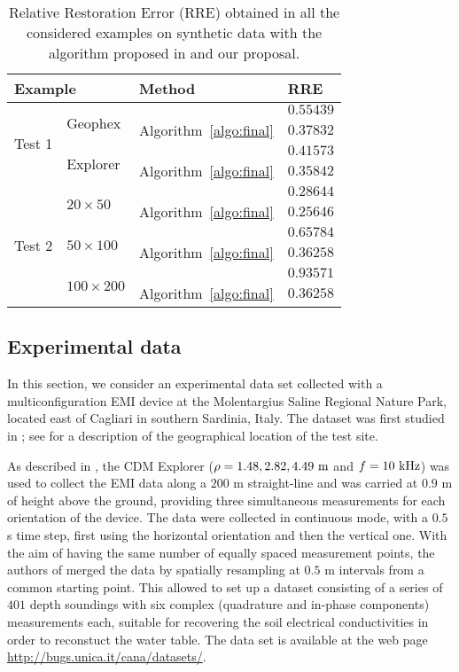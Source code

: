 \documentclass[final,leqno]{siamltex}
\begin{document}
\begin{table}
	\caption{Relative Restoration Error (RRE) obtained in all the considered examples on synthetic data with the algorithm proposed in \cite{ddrv19} and our proposal.}
	\label{tbl:rre}
	\begin{center}
		\begin{tabular}{l|l|l|l}
			\multicolumn{2}{l}{Example}&Method&RRE\\\hline
			\multirow{4}{*}{Test 1}&\multirow{2}{*}{Geophex}&\cite{ddrv19}&$0.55439$\\
			&&Algorithm~\ref{algo:final}&$0.37832$\\\cline{2-4}
			&\multirow{2}{*}{Explorer}&\cite{ddrv19}&$0.41573$\\
			&&Algorithm~\ref{algo:final}&$0.35842$\\\hline
			\multirow{6}{*}{Test 2}&\multirow{2}{*}{$20\times50$}&\cite{ddrv19}&$0.28644$\\
			&&Algorithm~\ref{algo:final}&$0.25646$\\\cline{2-4}
			&\multirow{2}{*}{$50\times100$}&\cite{ddrv19}&$0.65784$\\
			&&Algorithm~\ref{algo:final}&$0.36258$\\\cline{2-4}
			&\multirow{2}{*}{$100\times200$}&\cite{ddrv19}&$0.93571$\\
			&&Algorithm~\ref{algo:final}&$0.36258$\\\hline
		\end{tabular}
	\end{center}
\end{table}
\subsection{Experimental data}
In this section, we consider an experimental data set collected with a multiconfiguration EMI device at the Molentargius Saline Regional Nature Park, located east of Cagliari in southern Sardinia, Italy. The dataset was first studied in \cite{ddrv19}; see \cite{ddrv19} for a description of the geographical location of the test site.

As described in \cite{ddrv19}, the CDM Explorer ($\rho = 1.48, 2.82, 4.49~{\rm m}$ and $f = 10~{\rm kHz}$) was used to collect the EMI data along a $200$ m straight-line and was carried at $0.9$ m of height above the ground, providing three simultaneous measurements for each orientation of the device. The data were collected in continuous mode, with a $0.5$ s time step, first using the horizontal orientation and then the vertical one. With the aim of having the same number of equally spaced measurement points, the authors of \cite{ddrv19} merged the data by spatially resampling at $0.5$ m intervals from a common starting point. This allowed to set up a dataset consisting of a series of $401$ depth soundings with six complex (quadrature and in-phase components) measurements each, suitable for recovering the soil electrical conductivities in order to reconstuct the water table. The data set is available at the web page \url{http://bugs.unica.it/cana/datasets/}.
\end{document}
